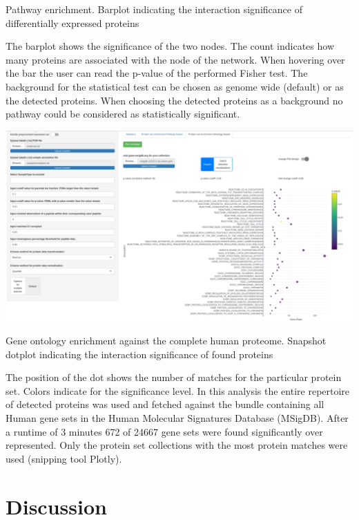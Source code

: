 \documentclass[
  11pt,
]{article}
\let\origfigure\figure
\begin{document}
\caption{Pathway enrichment. Barplot indicating the interaction significance of differentially expressed proteins}\label{fig:ui_path_enrich_bar}
 \endfigure\egroup

The barplot shows the significance of the two nodes. The count indicates
how many proteins are associated with the node of the network. When
hovering over the bar the user can read the p-value of the performed
Fisher test. The background for the statistical test can be chosen as
genome wide (default) or as the detected proteins. When choosing the
detected proteins as a background no pathway could be considered as
statistically significant.

\newpage
\bgroup  \origfigure[H] 

{\centering \includegraphics[width=0.9\linewidth]{screenshots/go_enrich_dot} 

}

\caption{Gene ontology enrichment against the complete human proteome. Snapshot dotplot indicating the interaction significance of found proteins}\label{fig:ui_go_enrich_bar}
 \endfigure\egroup

The position of the dot shows the number of matches for the particular
protein set. Colors indicate for the significance level. In this
analysis the entire repertoire of detected proteins was used and fetched
against the bundle containing all Human gene sets in the Human Molecular
Signatures Database (MSigDB). After a runtime of 3 minutes 672 of 24667
gene sets were found significantly over represented. Only the protein
set collections with the most protein matches were used (snipping tool
Plotly).

\newpage

\hypertarget{discussion}{%
\section{Discussion}\label{discussion}}
\end{document}
